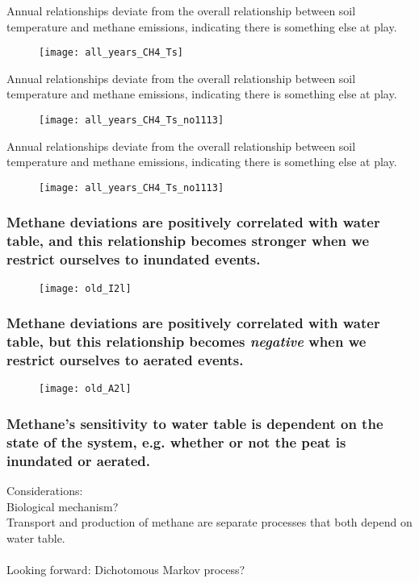 \documentclass{beamer}
\begin{document}
%
\begin{frame}
Annual relationships deviate from the overall relationship between soil temperature and methane emissions, indicating there is something else at play.
\begin{figure}[!htb]
\centering
\texttt{[image: all\_years\_CH4\_Ts]}
\end{figure}
\end{frame}

\begin{frame}
Annual relationships deviate from the overall relationship between soil temperature and methane emissions, indicating there is something else at play.
\begin{figure}[!htb]
\centering
\texttt{[image: all\_years\_CH4\_Ts\_no1113]}
\end{figure}
\end{frame}

\begin{frame}
Annual relationships deviate from the overall relationship between soil temperature and methane emissions, indicating there is something else at play.
\begin{figure}[!htb]
\centering
\texttt{[image: all\_years\_CH4\_Ts\_no1113]}
\end{figure}
\end{frame}



\begin{frame}
\frametitle{Methane deviations are positively correlated with water table, and this relationship becomes stronger when we restrict ourselves to inundated events.}
\begin{figure}[!htb]
\centering
\texttt{[image: old\_I2l]}
\end{figure}
\end{frame}

\begin{frame}
\frametitle{Methane deviations are positively correlated with water table, but this relationship becomes \textit{negative} when we restrict ourselves to aerated events. }
\begin{figure}[!htb]
\centering
\texttt{[image: old\_A2l]}
\end{figure}
\end{frame}

\begin{frame}
\frametitle{Methane's sensitivity to water table is dependent on the state of the system, e.g. whether or not the peat is inundated or aerated.}
Considerations:
\\
Biological mechanism?
\\
Transport and production of methane are separate processes that both depend on water table.
\\~\\
Looking forward: Dichotomous Markov process?

\end{frame}
\end{document}
